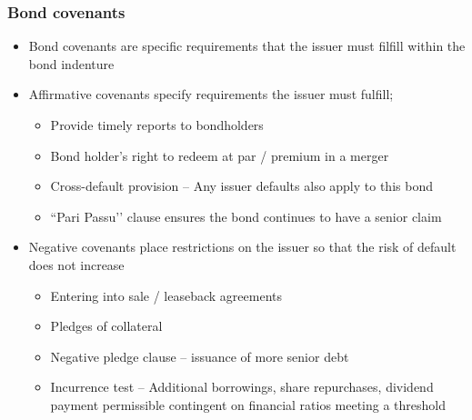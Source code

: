 \documentclass[../notes_compiled.tex]{subfiles}
\begin{document}
\subsubsection{Bond covenants}
\begin{itemize}
\item Bond covenants are specific requirements that the issuer must filfill within the bond indenture
\item Affirmative covenants specify requirements the issuer must fulfill;
\begin{itemize}
\item Provide timely reports to bondholders
\item Bond holder’s right to redeem at par / premium in a merger
\item Cross-default provision -- Any issuer defaults also apply to this bond
\item ``Pari Passu’’ clause ensures the bond continues to have a senior claim
\end{itemize}
\item Negative covenants place restrictions on the issuer so that the risk of default does not increase
\begin{itemize}
\item Entering into sale / leaseback agreements
\item Pledges of collateral
\item Negative pledge clause -- issuance of more senior debt
\item Incurrence test -- Additional borrowings, share repurchases, dividend payment permissible contingent on financial ratios meeting a threshold
\end{itemize}
\end{itemize}
\end{document}
